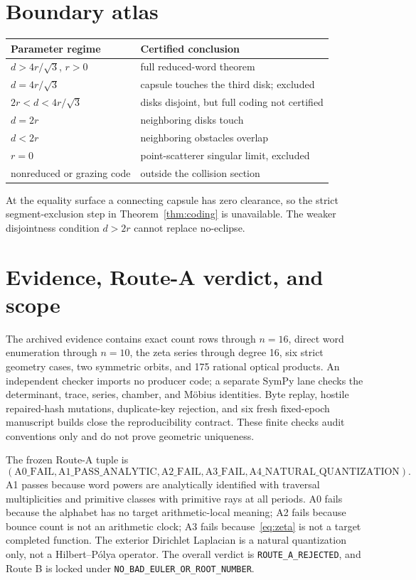 \documentclass[10pt]{article}
\begin{document}
\section{Boundary atlas}
\begin{center}
\begin{tabular}{@{}ll@{}}
\toprule
Parameter regime & Certified conclusion \\
\midrule
$d>4r/\sqrt3$, $r>0$ & full reduced-word theorem \\
$d=4r/\sqrt3$ & capsule touches the third disk; excluded \\
$2r<d<4r/\sqrt3$ & disks disjoint, but full coding not certified \\
$d=2r$ & neighboring disks touch \\
$d<2r$ & neighboring obstacles overlap \\
$r=0$ & point-scatterer singular limit, excluded \\
nonreduced or grazing code & outside the collision section \\
\bottomrule
\end{tabular}
\end{center}
At the equality surface a connecting capsule has zero clearance, so the
strict segment-exclusion step in Theorem~\ref{thm:coding} is unavailable.
The weaker disjointness condition $d>2r$ cannot replace no-eclipse.

\section{Evidence, Route-A verdict, and scope}
The archived evidence contains exact count rows through $n=16$, direct word
enumeration through $n=10$, the zeta series through degree 16, six strict
geometry cases, two symmetric orbits, and 175 rational optical products.
An independent checker imports no producer code; a separate SymPy lane checks
the determinant, trace, series, chamber, and Möbius identities.  Byte replay,
hostile repaired-hash mutations, duplicate-key rejection, and six fresh
fixed-epoch manuscript builds close the reproducibility contract.  These
finite checks audit conventions only and do not prove geometric uniqueness.

The frozen Route-A tuple is
\[
 (\mathrm{A0\_FAIL},\mathrm{A1\_PASS\_ANALYTIC},
   \mathrm{A2\_FAIL},\mathrm{A3\_FAIL},
   \mathrm{A4\_NATURAL\_QUANTIZATION}).
\]
A1 passes because word powers are analytically identified with traversal
multiplicities and primitive classes with primitive rays at all periods.  A0
fails because the alphabet has
no target arithmetic-local meaning; A2 fails because bounce count is not an
arithmetic clock; A3 fails because~\eqref{eq:zeta} is not a target completed
function.  The exterior Dirichlet Laplacian is a natural quantization only,
not a Hilbert--Pólya operator.  The overall verdict is
\texttt{ROUTE\_A\_REJECTED}, and Route B is locked under
\texttt{NO\_BAD\_EULER\_OR\_ROOT\_NUMBER}.
\end{document}
